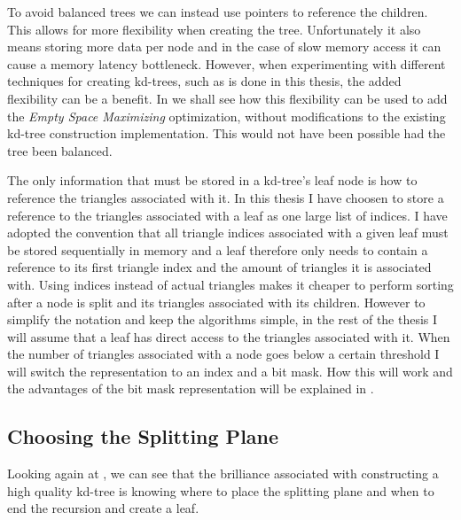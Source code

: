 To avoid balanced trees we can instead use pointers to reference the
children. This allows for more flexibility when creating the tree. Unfortunately
it also means storing more data per node and in the case of slow memory access
it can cause a memory latency bottleneck. However, when experimenting with
different techniques for creating kd-trees, such as is done in this thesis, the
added flexibility can be a benefit. In  we shall
see how this flexibility can be used to add the \textit{Empty Space Maximizing}
optimization, without modifications to the existing kd-tree construction
implementation. This would not have been possible had the tree been balanced.


The only information that must be stored in a kd-tree's leaf node is how to
reference the triangles associated with it. In this thesis I have choosen to
store a reference to the triangles associated with a leaf as one large list of
indices. I have adopted the convention that all triangle indices associated with
a given leaf must be stored sequentially in memory and a leaf therefore only
needs to contain a reference to its first triangle index and the amount of
triangles it is associated with. Using indices instead of actual triangles makes
it cheaper to perform sorting after a node is split and its triangles associated
with its children. However to simplify the notation and keep the algorithms
simple, in the rest of the thesis I will assume that a leaf has direct access to
the triangles associated with it. When the number of triangles associated with a
node goes below a certain threshold I will switch the representation to an index
and a bit mask. How this will work and the advantages of the bit mask
representation will be explained in .


\subsection{Choosing the Splitting Plane}\label{sec:splittingPlane}


Looking again at , we can see that the brilliance
associated with constructing a high quality kd-tree is knowing where to place
the splitting plane and when to end the recursion and create a leaf.

